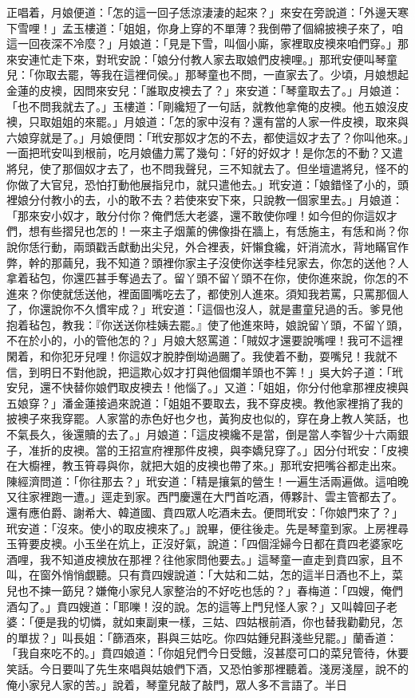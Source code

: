 \begin{showcontents}{}
正唱着，月娘便道：「怎的這一回子恁涼淒淒的起來？」來安在旁說道：「外邊天寒下雪哩！」孟玉樓道：「姐姐，你身上穿的不單薄？我倒帶了個綿披襖子來了，咱這一回夜深不冷麼？」月娘道：「見是下雪，叫個小廝，家裡取皮襖來咱們穿。」那來安連忙走下來，對玳安說：「娘分付教人家去取娘們皮襖哩。」那玳安便叫琴童兒：「你取去罷，等我在這裡伺侯。」那琴童也不問，一直家去了。少頃，月娘想起金蓮的皮襖，因問來安兒：「誰取皮襖去了？」來安道：「琴童取去了。」月娘道：「也不問我就去了。」玉樓道：「剛纔短了一句話，就教他拿俺的皮襖。他五娘沒皮襖，只取姐姐的來罷。」月娘道：「怎的家中沒有？還有當的人家一件皮襖，取來與六娘穿就是了。」月娘便問：「玳安那奴才怎的不去，都使這奴才去了？你叫他來。」一面把玳安叫到根前，吃月娘儘力罵了幾句：「好的好奴才！是你怎的不動？又遣將兒，使了那個奴才去了，也不問我聲兒，三不知就去了。但坐壇遣將兒，怪不的你做了大官兒，恐怕打動他展指兒巾，就只遣他去。」玳安道：「娘錯怪了小的，頭裡娘分付教小的去，小的敢不去？若使來安下來，只說教一個家里去。」月娘道：「那來安小奴才，敢分付你？俺們恁大老婆，還不敢使你哩！如今但的你這奴才們，想有些摺兒也怎的！一來主子烟薰的佛像掛在牆上，有恁施主，有恁和尚？你說你恁行動，兩頭戳舌獻動出尖兒，外合裡表，奸懶食纔，奸消流水，背地瞞官作弊，幹的那繭兒，我不知道？頭裡你家主子沒使你送李桂兒家去，你怎的送他？人拿着毡包，你還匹甚手奪過去了。留丫頭不留丫頭不在你，使你進來說，你怎的不進來？你使就恁送他，裡面圖嘴吃去了，都使別人進來。須知我若罵，只罵那個人了，你還說你不久慣牢成？」玳安道：「這個也沒人，就是畫童兒過的舌。爹見他抱着毡包，教我：『你送送你桂姨去罷。』使了他進來時，娘說留丫頭，不留丫頭，不在於小的，小的管他怎的？」月娘大怒罵道：「賊奴才還要說嘴哩！我可不這裡閑着，和你犯牙兒哩！你這奴才脫脖倒坳過颺了。我使着不動，耍嘴兒！我就不信，到明日不對他說，把這欺心奴才打與他個爛羊頭也不筭！」吳大妗子道：「玳安兒，還不快替你娘們取皮襖去！他惱了。」又道：「姐姐，你分付他拿那裡皮襖與五娘穿？」潘金蓮接過來說道：「姐姐不要取去，我不穿皮襖。教他家裡捎了我的披襖子來我穿罷。人家當的赤色好也夕也，黃狗皮也似的，穿在身上教人笑話，也不氣長久，後還贖的去了。」月娘道：「這皮襖纔不是當，倒是當人李智少十六兩銀子，准折的皮襖。當的王招宣府裡那件皮襖，與李嬌兒穿了。」因分付玳安：「皮襖在大櫥裡，教玉筲尋與你，就把大姐的皮襖也帶了來。」那玳安把嘴谷都走出來。陳經濟問道：「你往那去？」玳安道：「精是攘氣的營生！一遍生活兩遍做。這咱晚又往家裡跑一遭。」逕走到家。西門慶還在大門首吃酒，傅夥計、雲主管都去了。還有應伯爵、謝希大、韓道國、賁四眾人吃酒未去。便問玳安：「你娘門來了？」玳安道：「沒來。使小的取皮襖來了。」說畢，便往後走。先是琴童到家。上房裡尋玉筲要皮襖。小玉坐在炕上，正沒好氣，說道：「四個淫婦今日都在賁四老婆家吃酒哩，我不知道皮襖放在那裡？往他家問他要去。」這琴童一直走到賁四家，且不叫，在窗外悄悄覷聽。只有賁四嫂說道：「大姑和二姑，怎的這半日酒也不上，菜兒也不揀一筯兒？嫌俺小家兒人家整治的不好吃也恁的？」春梅道：「四嫂，俺們酒勾了。」賁四嫂道：「耶嚛！沒的說。怎的這等上門兒怪人家？」又叫韓回子老婆：「便是我的切憐，就如東副東一樣，三姑、四姑根前酒，你也替我勸勸兒，怎的單拔？」叫長姐：「篩酒來，斟與三姑吃。你四姑鍾兒斟淺些兒罷。」蘭香道：「我自來吃不的。」賁四娘道：「你姐兒們今日受餓，沒甚麼可口的菜兒管待，休要笑話。今日要叫了先生來唱與姑娘們下酒，又恐怕爹那裡聽着。淺房淺屋，說不的俺小家兒人家的苦。」說着，琴童兒敲了敲門，眾人多不言語了。半日
\end{showcontents}
